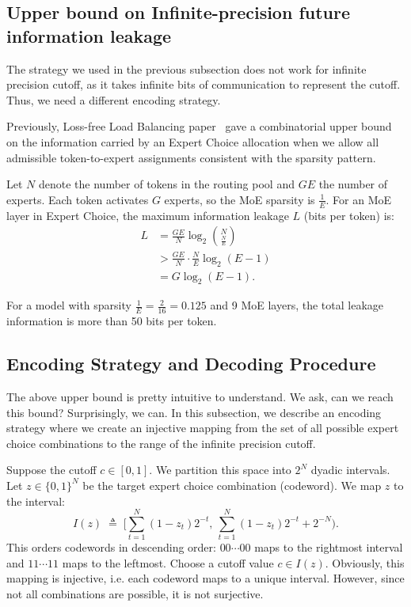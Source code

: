 \documentclass{article}
\theoremstyle{plain}
\theoremstyle{definition}
\theoremstyle{remark}
\begin{document}
\subsection{Upper bound on Infinite-precision future information leakage}

The strategy we used in the previous subsection does not work for infinite precision cutoff, as it takes infinite bits of communication to represent the cutoff. Thus, we need a different encoding strategy.

Previously, Loss-free Load Balancing paper~\citet{wang2024auxiliarylossfreeloadbalancingstrategy} gave a combinatorial upper bound on the information carried by an Expert Choice allocation when we allow all admissible token-to-expert assignments consistent with the sparsity pattern.

Let $N$ denote the number of tokens in the routing pool and $GE$ the number of experts. Each token activates $G$ experts, so the MoE sparsity is $\frac{1}{E}$. For an MoE layer in Expert Choice, the maximum information leakage $L$ (bits per token) is:
\begin{align}
L
&= \frac{GE}{N}\log_2\!\binom{N}{\frac{N}{E}} \nonumber\\
&> \frac{GE}{N}\cdot\frac{N}{E}\log_2(E-1) \nonumber\\
&= G\log_2(E-1).
\tag{7}
\end{align}

For a model with sparsity $\frac{1}{E}=\frac{2}{16}=0.125$ and 9 MoE layers, the total leakage information is more than 50 bits per token.

\subsection{Encoding Strategy and Decoding Procedure}

The above upper bound is pretty intuitive to understand. We ask, can we reach this bound? Surprisingly, we can. In this subsection, we describe an encoding strategy where we create an injective mapping from the set of all possible expert choice combinations to the range of the infinite precision cutoff.

Suppose the cutoff $c \in [0,1]$. We partition this space into $2^N$ dyadic intervals. Let $z \in \{0,1\}^N$ be the target expert choice combination (codeword). We map $z$ to the interval:
\[
I(z)\;\triangleq\;\Big[\sum_{t=1}^N (1-z_t)2^{-t},\ \sum_{t=1}^N (1-z_t)2^{-t} + 2^{-N}\Big).
\]
This orders codewords in descending order: $00\cdots 00$ maps to the rightmost interval and $11\cdots 11$ maps to the leftmost. Choose a cutoff value $c\in I(z)$. Obviously, this mapping is injective, i.e. each codeword maps to a unique interval. However, since not all combinations are possible, it is not surjective.
\end{document}
